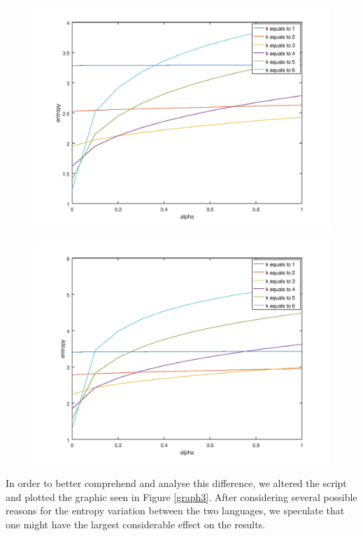 \documentclass[12pt]{article}
\begin{document}
\begin{figure}[H]
  \centering
  \begin{minipage}{.5\textwidth}
    \centering
    \includegraphics[width=\linewidth]{bible_en.png}
    \label{smallgraph1}
  \end{minipage}%
  \begin{minipage}{.5\textwidth}
    \centering
    \includegraphics[width=\linewidth]{bible_pt.png}
    \label{smallgraph2}
  \end{minipage}
\end{figure}

In order to better comprehend and analyse this difference, we altered the script
and plotted the graphic seen in Figure \ref{graph3}.
After considering several possible reasons for the entropy variation between
the two languages, we speculate that one might have the largest considerable 
effect on the results.
\end{document}

